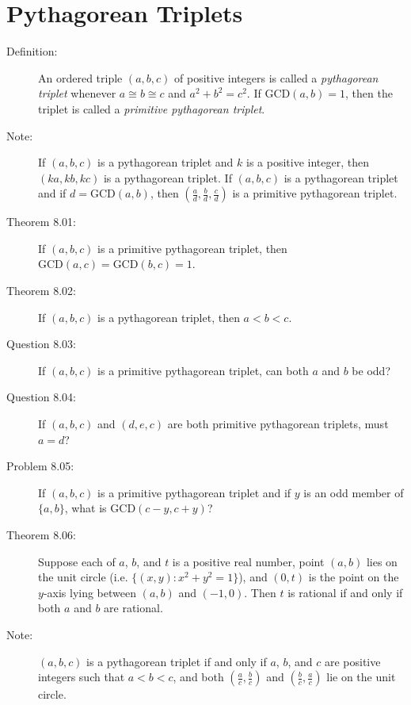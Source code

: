 \documentclass{article}
\begin{document}
\section{Pythagorean Triplets}

\begin{description}

  \item[Definition:] An ordered triple $(a, b, c)$ of positive integers is called a \emph{pythagorean triplet} whenever $a \cong b \cong c$ and $a^2 + b^2 = c^2$. If $\text{GCD}(a,b) = 1$, then the triplet is called a \emph{primitive pythagorean triplet}. 

  \item[Note:] If $(a,b,c)$ is a pythagorean triplet and $k$ is a positive integer, then $(ka,kb,kc)$ is a pythagorean triplet. If $(a,b,c)$ is a pythagorean triplet and if $d = \text{GCD}(a,b)$, then $(\frac{a}{d}, \frac{b}{d}, \frac{c}{d})$ is a primitive pythagorean triplet.

  \item[Theorem 8.01:] If $(a,b,c)$ is a primitive pythagorean triplet, then $\text{GCD}(a,c) = \text{GCD}(b,c) = 1$.

  \item[Theorem 8.02:] If $(a,b,c)$ is a pythagorean triplet, then $a<b<c$.

  \item[Question 8.03:] If $(a,b,c)$ is a primitive pythagorean triplet, can both $a$ and $b$ be odd?

  \item[Question 8.04:] If $(a,b,c)$ and $(d,e,c)$ are both primitive pythagorean triplets, must $a=d$?

  \item[Problem 8.05:] If $(a,b,c)$ is a primitive pythagorean triplet and if $y$ is an odd member of $\{ a, b \}$, what is $\text{GCD}(c-y, c+y)$?

  \item[Theorem 8.06:] Suppose each of $a$, $b$, and $t$ is a positive real number, point $(a,b)$ lies on the unit circle (i.e. $\{ (x,y): x^2+y^2=1 \}$), and $(0,t)$ is the point on the $y$-axis lying between $(a,b)$ and $(-1,0)$. Then $t$ is rational if and only if both $a$ and $b$ are rational.

  \item[Note:] $(a,b,c)$ is a pythagorean triplet if and only if $a$, $b$, and $c$ are positive integers such that $a<b<c$, and both $(\frac{a}{c}, \frac{b}{c})$ and $(\frac{b}{c}, \frac{a}{c})$ lie on the unit circle.


\end{description}
\end{document}
